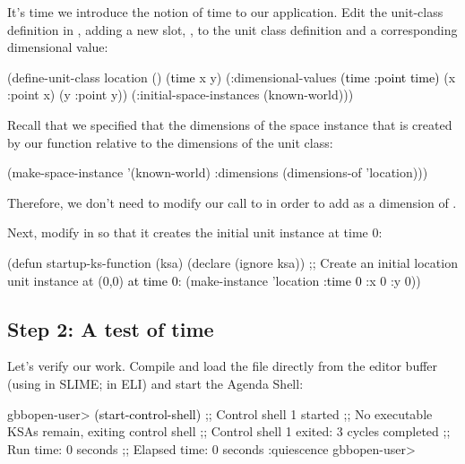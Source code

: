 \documentclass[10pt,twoside,english,pdftex]{article}
\begin{document}
It's time we introduce the notion of time to our application.  Edit the
 unit-class definition in , adding
a new slot, , to the  unit class definition and a
corresponding  dimensional value:
%
\W\supp
\begin{example}
\textcolor{darkergray}{%
  (define-unit-class location ()
    (\textcolor{black}{time} 
     x y)
    (:dimensional-values
      \textcolor{black}{(time :point time)}
      (x :point x)
      (y :point y))
    (:initial-space-instances (known-world)))}
\end{example}

Recall that we specified that the dimensions of the  space
instance that is created by our  function relative to
the dimensions of the  unit class:
%
\W\supp
\begin{example}
\textcolor{darkergray}{%
  (make-space-instance 
      '(known-world)
      :dimensions (dimensions-of 'location)))}
\end{example}
%
Therefore, we don't need to modify our call to  in
order to add  as a dimension of .

Next, modify  in  so
that it creates the initial  unit instance at time 0:
%
\W\supp
\begin{example}
\textcolor{darkergray}{%
  (defun startup-ks-function (ksa)
    (declare (ignore ksa))
    ;; Create an initial location unit instance at (0,0) \textcolor{black}{at time 0}:
    (make-instance 'location \textcolor{black}{:time 0} :x 0 :y 0))}
\end{example}

\subsection*{Step 2: A test of time}

Let's verify our work.  Compile and load the  file
directly from the editor buffer (using  in SLIME; 
in ELI) and start the Agenda Shell:
%
\W\supp
\begin{example}
\textcolor{darkergray}{%
  gbbopen-user> \textcolor{black}{(start-control-shell)}
  ;; Control shell 1 started
  ;; No executable KSAs remain, exiting control shell
  ;; Control shell 1 exited: 3 cycles completed
  ;; Run time: 0 seconds
  ;; Elapsed time: 0 seconds
  :quiescence
  gbbopen-user>}
\end{example}
\end{document}
